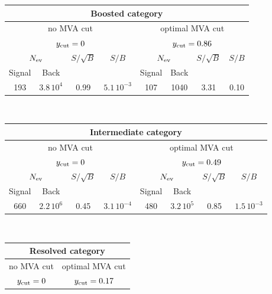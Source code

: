 \begin{table}[t]
  \centering
  \begin{tabular}{c|c|c|c||c|c|c|c}
    \hline
    \multicolumn{8}{c}{Boosted category}\\
    \hline
    \hline
    \multicolumn{4}{c||}{no MVA cut} & \multicolumn{4}{c}{optimal MVA cut}\\
    \multicolumn{4}{c||}{$y_{\rm cut}=0$} & \multicolumn{4}{c}{$y_{\rm cut}=0.86$}\\
    \hline
    \multicolumn{2}{c|}{$N_{\rm ev}$} &  $S/\sqrt{B}$  & $S/B$
    & \multicolumn{2}{c|}{$N_{\rm ev}$} &  $S/\sqrt{B}$  & $S/B$\\
        Signal & Back   &     &   &  Signal & Back   &     &    \\
    \hline
      193   &  $3.8\,10^4$    &  0.99    &  $5.1\,10^{-3}$  & 107 & 1040 & 3.31  & 0.10\\
        \hline
  \end{tabular}
   $\,$\\
  \vspace{0.4cm}
  \noindent
  \begin{tabular}{c|c|c|c||c|c|c|c}
    \hline
    \multicolumn{8}{c}{Intermediate category}\\
    \hline
    \hline
    \multicolumn{4}{c||}{no MVA cut} & \multicolumn{4}{c}{optimal MVA cut}\\
    \multicolumn{4}{c||}{$y_{\rm cut}=0$} & \multicolumn{4}{c}{$y_{\rm cut}=0.49$}\\
    \hline
    \multicolumn{2}{c|}{$N_{\rm ev}$} &  $S/\sqrt{B}$  & $S/B$
    & \multicolumn{2}{c|}{$N_{\rm ev}$} &  $S/\sqrt{B}$  & $S/B$\\
        Signal & Back   &     &   &  Signal & Back   &     &    \\
    \hline
      660   &   $2.2\,10^6$   &   0.45   &  $3.1\,10^{-4}$ & 480  & $3.2\,10^5$ & 0.85  & $1.5\,10^{-3}$ \\
        \hline
  \end{tabular}
    $\,$\\
  \vspace{0.4cm}
  \noindent
  \begin{tabular}{c|c|c|c||c|c|c|c}
    \hline
    \multicolumn{8}{c}{Resolved category}\\
    \hline
    \hline
    \multicolumn{4}{c||}{no MVA cut} & \multicolumn{4}{c}{optimal MVA cut}\\
    \multicolumn{4}{c||}{$y_{\rm cut}=0$} & \multicolumn{4}{c}{$y_{\rm cut}=0.17$}\\

\end{tabular}
\end{table}
